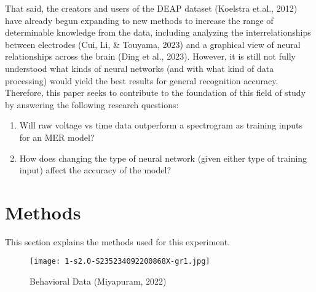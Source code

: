 \documentclass[fleqn,10pt]{SelfArx} %
\begin{document}
That said, the creators and users of the DEAP dataset (Koelstra et.al., 2012) have already begun expanding to new methods to increase the range of determinable knowledge from the data, including analyzing the interrelationships between electrodes (Cui, Li, \& Touyama, 2023) and a graphical view of neural relationships across the brain (Ding et al., 2023). However, it is still not fully understood what kinds of neural networks (and with what kind of data processing) would yield the best results for general recognition accuracy. Therefore, this paper seeks to contribute to the foundation of this field of study by answering the following research questions:

\begin{enumerate}
    \item Will raw voltage vs time data outperform a spectrogram as training inputs for an MER model?
    \item How does changing the type of neural network (given either type of training input) affect the accuracy of the model?
\end{enumerate}


\section{Methods}

This section explains the methods used for this experiment. 
\begin{figure}
    \centering
    \texttt{[image: 1-s2.0-S235234092200868X-gr1.jpg]}
    \caption{Behavioral Data (Miyapuram, 2022)}
    \label{fig:data_dist}
\end{figure}
\end{document}
